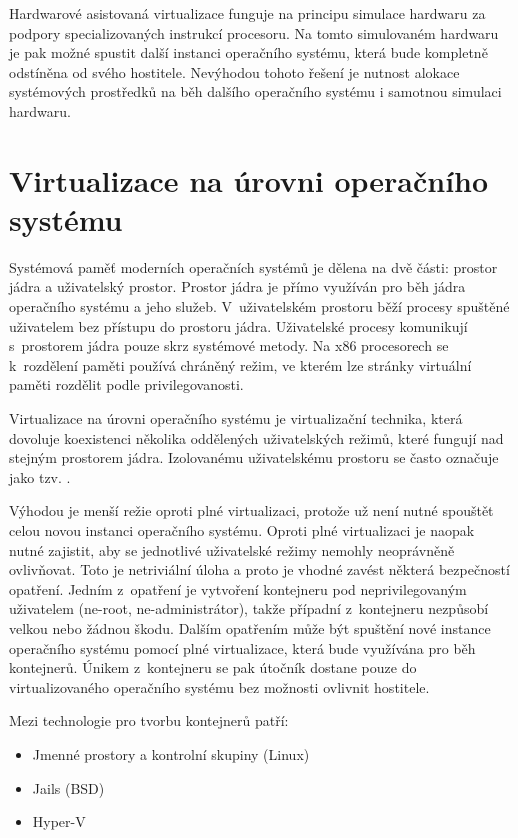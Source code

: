 Hardwarové asistovaná virtualizace funguje na principu simulace hardwaru za podpory specializovaných instrukcí procesoru.
Na tomto simulovaném hardwaru je pak možné spustit další instanci operačního systému, která bude kompletně odstíněna od svého hostitele.
Nevýhodou tohoto řešení je nutnost alokace systémových prostředků na běh dalšího operačního systému i samotnou simulaci hardwaru.

\section{Virtualizace na úrovni operačního systému}

Systémová paměť moderních operačních systémů je dělena na dvě části: prostor jádra a uživatelský prostor.
Prostor jádra je přímo využíván pro běh jádra operačního systému a jeho služeb.
V~uživatelském prostoru běží procesy spuštěné uživatelem bez přístupu do prostoru jádra.
Uživatelské procesy komunikují s~prostorem jádra pouze skrz systémové metody.
Na x86 procesorech se k~rozdělení paměti používá chráněný režim, ve kterém lze stránky virtuální paměti rozdělit podle privilegovanosti.

Virtualizace na úrovni operačního systému je virtualizační technika, která dovoluje koexistenci několika oddělených uživatelských režimů, které fungují nad stejným prostorem jádra.
Izolovanému uživatelskému prostoru se často označuje jako tzv. .

Výhodou je menší režie oproti plné virtualizaci, protože už není nutné spouštět celou novou instanci operačního systému.
Oproti plné virtualizaci je naopak nutné zajistit, aby se jednotlivé uživatelské režimy nemohly neoprávněně ovlivňovat.
Toto je netriviální úloha a proto je vhodné zavést některá bezpečností opatření.
Jedním z~opatření je vytvoření kontejneru pod neprivilegovaným uživatelem (ne-root, ne-administrátor), takže případní  z~kontejneru nezpůsobí velkou nebo žádnou škodu.
Dalším opatřením může být spuštění nové instance operačního systému pomocí plné virtualizace, která bude využívána pro běh kontejnerů.
Únikem z~kontejneru se pak útočník dostane pouze do virtualizovaného operačního systému bez možnosti ovlivnit hostitele.

{
Mezi technologie pro tvorbu kontejnerů patří:

\begin{itemize}
	\item Jmenné prostory a kontrolní skupiny (Linux)
	\item Jails (BSD)
	\item Hyper-V
\end{itemize}
}

